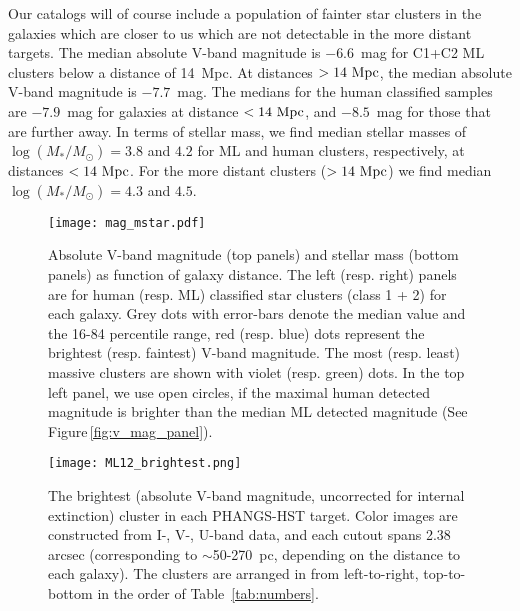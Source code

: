 \documentclass[linenumbers]{aastex63}
\begin{document}
{%

Our catalogs will of course include a population of fainter star clusters in the galaxies which are closer to us which are not detectable in the more distant targets.
The median absolute V-band magnitude is $-6.6$~mag for C1+C2 ML clusters below a distance of 14~Mpc. At distances $>14~{\rm Mpc}$, the median absolute V-band magnitude is $-7.7$~mag. The medians for the human classified samples are $-7.9$~mag for galaxies at distance $<14~{\rm Mpc}$, and $-8.5$~mag for those that are further away. 
In terms of stellar mass, we find median stellar masses of $\log(M_*/M_{\odot}) = 3.8$ and $4.2$ for ML and human clusters, respectively, at distances $<14~{\rm Mpc}$. For the more distant clusters ($>14~{\rm Mpc}$) we find median $\log(M_*/M_{\odot}) = 4.3$ and $4.5$. %
%

\begin{figure*}
\texttt{[image: mag\_mstar.pdf]}
 \caption{Absolute V-band magnitude (top panels) and stellar mass (bottom panels) as function of galaxy distance. The left (resp. right) panels are for human (resp. ML) classified star clusters (class 1 + 2) for each galaxy. Grey dots with error-bars denote the median value and the 16-84 percentile range, red (resp. blue) dots represent the brightest (resp. faintest) V-band magnitude. The most (resp. least) massive clusters are shown with violet (resp. green) dots.  
 In the top left panel, we use open circles, if the maximal human detected magnitude is brighter than the median ML detected magnitude (See Figure\,\ref{fig:v_mag_panel}).} 
 \label{fig:mag_mstar}
\end{figure*}
%
\begin{figure*}
\texttt{[image: ML12\_brightest.png]}
 \caption{The brightest (absolute V-band magnitude, uncorrected for internal extinction) cluster in each PHANGS-HST target. Color images are constructed from I-, V-, U-band data, and each cutout spans 2.38 arcsec (corresponding to $\sim$50-270~pc, depending on the distance to each galaxy). The clusters are arranged in from left-to-right, top-to-bottom in the order of Table~\ref{tab:numbers}.} 
 \label{fig:ML12_brightestMV}
\end{figure*}




}
\end{document}
